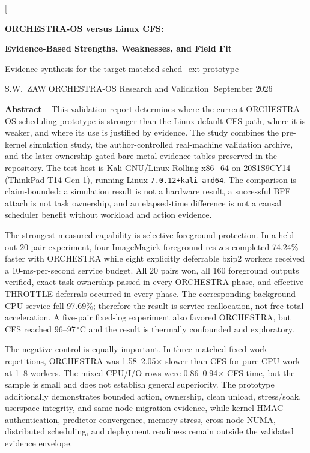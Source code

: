 \documentclass[10pt,letterpaper,twocolumn]{article}
\newcommand{\hostid}{20S1S9CY14 (ThinkPad T14 Gen 1)}
\newcommand{\AUTHOR}{S.W.\ ZAW}
\begin{document}
\twocolumn[
\begin{center}
  {\Large\bfseries\sffamily ORCHESTRA-OS versus Linux CFS:\par}
  \vspace{0.15em}
  {\Large\bfseries\sffamily Evidence-Based Strengths, Weaknesses, and Field Fit\par}
  \vspace{0.45em}
  {\normalsize Evidence synthesis for the target-matched sched\_ext prototype\par}
  \vspace{0.12em}
  {\footnotesize \AUTHOR\quad |\quad ORCHESTRA-OS Research and Validation\quad | September 2026\par}
\end{center}
\vspace{0.28em}
\begin{minipage}{0.965\textwidth}
\noindent\textbf{Abstract---}This validation report determines where the current ORCHESTRA-OS scheduling prototype is stronger than the Linux default CFS path, where it is weaker, and where its use is justified by evidence. The study combines the pre-kernel simulation study, the author-controlled real-machine validation archive, and the later ownership-gated bare-metal evidence tables preserved in the repository. The test host is Kali GNU/Linux Rolling x86\_64 on \hostid, running Linux \texttt{7.0.12+kali-amd64}. The comparison is claim-bounded: a simulation result is not a hardware result, a successful BPF attach is not task ownership, and an elapsed-time difference is not a causal scheduler benefit without workload and action evidence.

The strongest measured capability is selective foreground protection. In a held-out 20-pair experiment, four ImageMagick foreground resizes completed 74.24\% faster with ORCHESTRA while eight explicitly deferrable bzip2 workers received a 10-ms-per-second service budget. All 20 pairs won, all 160 foreground outputs verified, exact task ownership passed in every ORCHESTRA phase, and effective THROTTLE deferrals occurred in every phase. The corresponding background CPU service fell 97.69\%; therefore the result is service reallocation, not free total acceleration. A five-pair fixed-log experiment also favored ORCHESTRA, but CFS reached 96--97\,$^\circ$C and the result is thermally confounded and exploratory.

The negative control is equally important. In three matched fixed-work repetitions, ORCHESTRA was 1.58--2.05$\times$ slower than CFS for pure CPU work at 1--8 workers. The mixed CPU/I/O rows were 0.86--0.94$\times$ CFS time, but the sample is small and does not establish general superiority. The prototype additionally demonstrates bounded action, ownership, clean unload, stress/soak, userspace integrity, and same-node migration evidence, while kernel HMAC authentication, predictor convergence, memory stress, cross-node NUMA, distributed scheduling, and deployment readiness remain outside the validated evidence envelope.


\end{minipage}
\end{document}

